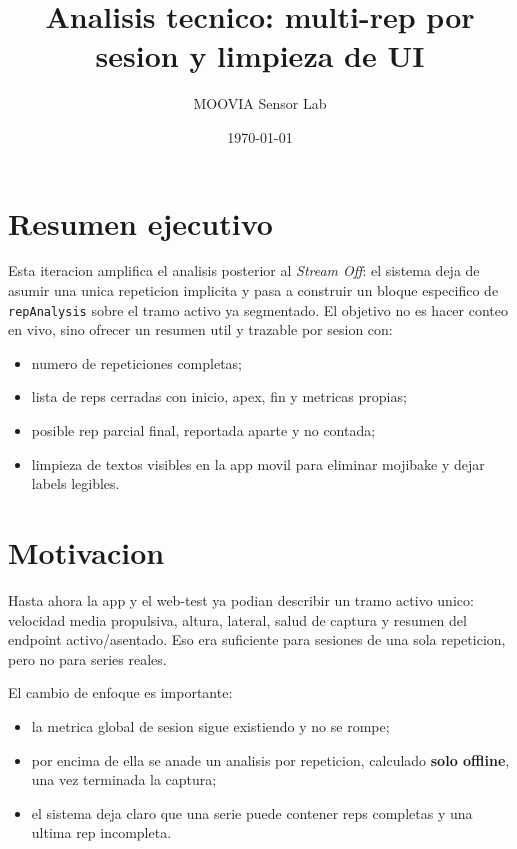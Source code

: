 \documentclass[11pt,a4paper]{article}
\title{Analisis tecnico: multi-rep por sesion y limpieza de UI}
\author{MOOVIA Sensor Lab}
\date{\today}
\begin{document}
\maketitle

\section*{Resumen ejecutivo}
Esta iteracion amplifica el analisis posterior al \emph{Stream Off}: el sistema deja de asumir una unica repeticion implicita y pasa a construir un bloque especifico de \texttt{repAnalysis} sobre el tramo activo ya segmentado. El objetivo no es hacer conteo en vivo, sino ofrecer un resumen util y trazable por sesion con:
\begin{itemize}[leftmargin=14pt]
  \item numero de repeticiones completas;
  \item lista de reps cerradas con inicio, apex, fin y metricas propias;
  \item posible rep parcial final, reportada aparte y no contada;
  \item limpieza de textos visibles en la app movil para eliminar mojibake y dejar labels legibles.
\end{itemize}

\section{Motivacion}
Hasta ahora la app y el web-test ya podian describir un tramo activo unico: velocidad media propulsiva, altura, lateral, salud de captura y resumen del endpoint activo/asentado. Eso era suficiente para sesiones de una sola repeticion, pero no para series reales.

El cambio de enfoque es importante:
\begin{itemize}[leftmargin=14pt]
  \item la metrica global de sesion sigue existiendo y no se rompe;
  \item por encima de ella se anade un analisis por repeticion, calculado \textbf{solo offline}, una vez terminada la captura;
  \item el sistema deja claro que una serie puede contener reps completas y una ultima rep incompleta.
\end{itemize}
\end{document}
